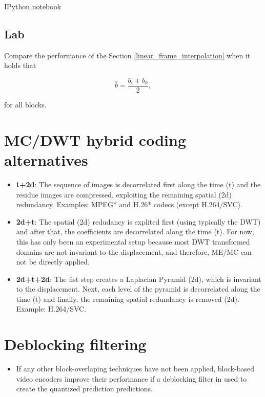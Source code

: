 \href{https://nbviewer.jupyter.org/github/vicente-gonzalez-ruiz/video_coding/blob/master/subpixel_accuracy.ipynb}{IPython notebook}

\subsection{Lab}
Compare the performance of the Section \ref{linear_frame_interpolation}
when it holds that

\begin{equation}
   \hat{b} = \frac{b_i + b_k}{2},
\end{equation}

for all blocks.

\section{MC/DWT hybrid coding alternatives}
\begin{itemize}
\item
  \textbf{t+2d}: The sequence of images is decorrelated first along the
  time (t) and the residue images are compressed, exploiting the
  remaining spatial (2d) redundancy. Examples: MPEG* and H.26* codecs
  (except H.264/SVC).
\item
  \textbf{2d+t}: The spatial (2d) redudancy is explited first (using
  typically the DWT) and after that, the coefficients are decorrelated
  along the time (t). For now, this has only been an experimental setup
  because most DWT transformed domains are not invariant to the
  displacement, and therefore, ME/MC can not be directly applied.
\item
  \textbf{2d+t+2d}: The fist step creates a Laplacian Pyramid (2d),
  which is invariant to the displacement. Next, each level of the
  pyramid is decorrelated along the time (t) and finally, the remaining
  spatial redundancy is removed (2d). Example: H.264/SVC.
\end{itemize}


\section{Deblocking filtering}
\begin{itemize}
\tightlist
\item
  If any other block-overlaping techniques have not been applied,
  block-based video encoders improve their performance if a deblocking
  filter in used to create the quantized prediction predictions.
\end{itemize}


